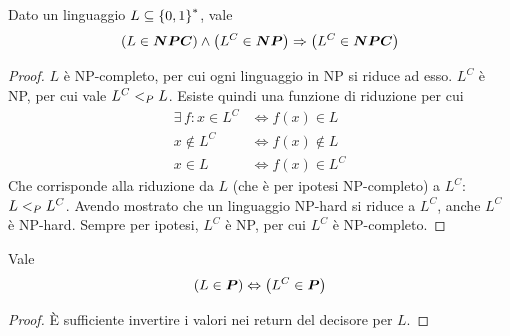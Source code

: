 \begin{theorem}
    \label{teo:riduzionecomplementare}
    Dato un linguaggio $
    L \subseteq \left\{0,1\right\}^{*}
    $,
    vale
    \begin{equation*}
        \left( L \in \bm{NPC} \right)
        \wedge
        \left( L^C \in \bm{NP} \right)
        \Rightarrow
        \left( L^C \in \bm{NPC} \right)
    \end{equation*}
    \begin{proof}
        $L$ è NP-completo, per cui ogni linguaggio in NP si riduce ad esso. $L^C$ è NP, per cui vale $L^C <_P L$.
        Esiste quindi una funzione di riduzione per cui
        \begin{align*}
            \exists \, f :
            x \in L^C
            & \Leftrightarrow
            f(x) \in L
            \\
            x \notin L^C
            & \Leftrightarrow
            f(x) \notin L
            \\
            x \in L
            & \Leftrightarrow
            f(x) \in L^C
        \end{align*}
        Che corrisponde alla riduzione da $L$ (che è per ipotesi NP-completo) a $L^C$: $L <_P L^C$.
        Avendo mostrato che un linguaggio NP-hard si riduce a $L^C$, anche $L^C$ è NP-hard.
        Sempre per ipotesi, 
        $L^C$ è NP, per cui $L^C$ è NP-completo.
    \end{proof}
\end{theorem}

\begin{lemma}
    \label{lem:lplcp}
    Vale
    \begin{equation*}
        \left( L \in \bm{P} \right)
        \Leftrightarrow
        \left( L^C \in \bm{P} \right)
    \end{equation*}
    \begin{proof}
        È sufficiente invertire i valori nei return del decisore per $L$.
    \end{proof}
\end{lemma}

